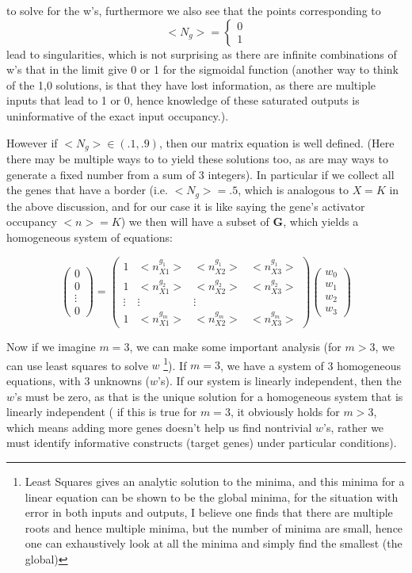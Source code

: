 to solve for the w's, furthermore we also see that the points corresponding to $$<N_{g}> =\begin{cases}0  \\ 1 \end{cases}$$ lead to singularities, which is not surprising as there are infinite combinations of w's that in the limit give 0 or 1 for the sigmoidal function (another way to think of the 1,0 solutions, is that they have lost information, as there are multiple inputs that lead to 1 or 0, hence knowledge of these saturated outputs is uninformative of the exact input occupancy.).

However if $<N_{g}> \in (.1,.9)$, then our matrix equation is well defined.  (Here there may be multiple ways to to yield these solutions too, as are may ways to generate a fixed number from a sum of 3 integers). In particular if we collect all the genes that have a border (i.e.  $<N_{g}> = .5$, which is analogous to $X=K$ in the above discussion, and for our case it is like saying the gene's activator occupancy $<n>=K$) we then will have a subset of \textbf{G}, which yields a homogeneous system of equations:



\[
\begin{pmatrix} 0\\0\\ \vdots \\ 0\end{pmatrix}=
 \begin{pmatrix}
     1&<n_{X1}^{g_1}> & <n_{X2}^{g_1}> & <n_{X3}^{g_1}>  \\
   1&<n_{X1}^{g_2}> & <n_{X2}^{g_2}> & <n_{X3}^{g_2}> \\
    \vdots & \vdots & \vdots \\
   1&<n_{X1}^{g_m}> & <n_{X2}^{g_m}> & <n_{X3}^{g_m}>
 \end{pmatrix} \begin{pmatrix} w_0 \\ w_1 \\ w_2 \\ w_3 \end{pmatrix}
\]

Now if we imagine $m = 3$, we can make some important analysis (for $m > 3$, we can use least squares to solve $w$ \footnote[1]{ Least Squares gives an analytic solution to the minima, and this minima for a linear equation can be shown to be the global minima, for the situation with error in both inputs and outputs, I believe one finds that there are multiple roots and hence multiple minima, but the number of minima are small, hence one can exhaustively look at all the minima and simply find the smallest (the global)}).  If $m=3$, we have a system of 3 homogeneous equations, with 3 unknowns ($w$'s).  If our system is linearly independent, then the $w$'s must be zero, as that is the unique solution for a homogeneous system that is linearly independent ( if this is true for $m=3$, it obviously holds for $m >3$, which means adding more genes doesn't help us find nontrivial $w$'s, rather we must identify informative constructs (target genes) under particular conditions). 


